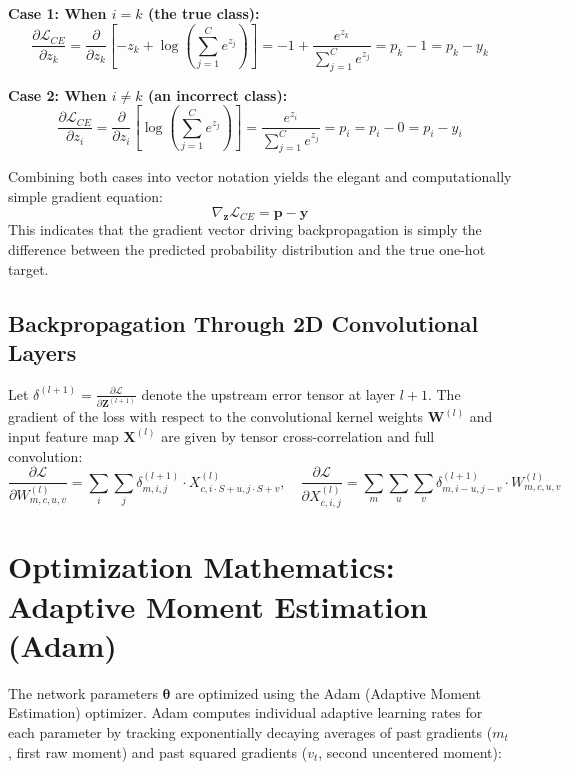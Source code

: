 \documentclass[11pt,a4paper,oneside]{report}
\begin{document}
\textbf{Case 1: When $i = k$ (the true class):}
\begin{equation}
    \frac{\partial \mathcal{L}_{CE}}{\partial z_k} = \frac{\partial}{\partial z_k}\left[ -z_k + \log\left(\sum_{j=1}^{C} e^{z_j}\right) \right] = -1 + \frac{e^{z_k}}{\sum_{j=1}^{C} e^{z_j}} = p_k - 1 = p_k - y_k
\end{equation}

\textbf{Case 2: When $i \ne k$ (an incorrect class):}
\begin{equation}
    \frac{\partial \mathcal{L}_{CE}}{\partial z_i} = \frac{\partial}{\partial z_i}\left[ \log\left(\sum_{j=1}^{C} e^{z_j}\right) \right] = \frac{e^{z_i}}{\sum_{j=1}^{C} e^{z_j}} = p_i = p_i - 0 = p_i - y_i
\end{equation}

Combining both cases into vector notation yields the elegant and computationally simple gradient equation:
\begin{equation}
    \nabla_{\mathbf{z}} \mathcal{L}_{CE} = \mathbf{p} - \mathbf{y}
\end{equation}
This indicates that the gradient vector driving backpropagation is simply the difference between the predicted probability distribution and the true one-hot target.

\subsection{Backpropagation Through 2D Convolutional Layers}
Let $\delta^{(l+1)} = \frac{\partial \mathcal{L}}{\partial \mathbf{Z}^{(l+1)}}$ denote the upstream error tensor at layer $l+1$. The gradient of the loss with respect to the convolutional kernel weights $\mathbf{W}^{(l)}$ and input feature map $\mathbf{X}^{(l)}$ are given by tensor cross-correlation and full convolution:
\begin{equation}
    \frac{\partial \mathcal{L}}{\partial W_{m, c, u, v}^{(l)}} = \sum_{i} \sum_{j} \delta_{m, i, j}^{(l+1)} \cdot X_{c, i\cdot S + u, j\cdot S + v}^{(l)}, \quad \frac{\partial \mathcal{L}}{\partial X_{c, i, j}^{(l)}} = \sum_{m} \sum_{u} \sum_{v} \delta_{m, i - u, j - v}^{(l+1)} \cdot W_{m, c, u, v}^{(l)}
\end{equation}

\section{Optimization Mathematics: Adaptive Moment Estimation (Adam)}
The network parameters $\boldsymbol{\theta}$ are optimized using the Adam (Adaptive Moment Estimation) optimizer. Adam computes individual adaptive learning rates for each parameter by tracking exponentially decaying averages of past gradients ($m_t$, first raw moment) and past squared gradients ($v_t$, second uncentered moment):
\end{document}
